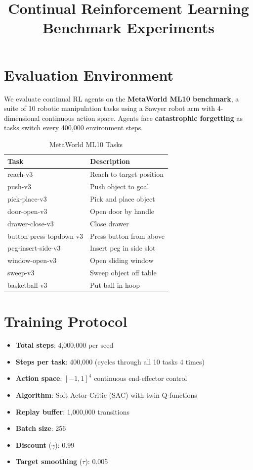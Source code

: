\documentclass{article}
\title{Continual Reinforcement Learning Benchmark Experiments}
\author{}
\date{}
\begin{document}
\maketitle

\section{Evaluation Environment}

We evaluate continual RL agents on the \textbf{MetaWorld ML10 benchmark}, a suite of 10 robotic manipulation tasks using a Sawyer robot arm with 4-dimensional continuous action space. Agents face \textbf{catastrophic forgetting} as tasks switch every 400,000 environment steps.

\begin{table}[h]
\centering
\caption{MetaWorld ML10 Tasks}
\begin{tabular}{ll}
\toprule
Task & Description \\
\midrule
reach-v3 & Reach to target position \\
push-v3 & Push object to goal \\
pick-place-v3 & Pick and place object \\
door-open-v3 & Open door by handle \\
drawer-close-v3 & Close drawer \\
button-press-topdown-v3 & Press button from above \\
peg-insert-side-v3 & Insert peg in side slot \\
window-open-v3 & Open sliding window \\
sweep-v3 & Sweep object off table \\
basketball-v3 & Put ball in hoop \\
\bottomrule
\end{tabular}
\end{table}

\section{Training Protocol}

\begin{itemize}
    \item \textbf{Total steps}: 4,000,000 per seed
    \item \textbf{Steps per task}: 400,000 (cycles through all 10 tasks 4 times)
    \item \textbf{Action space}: $[-1, 1]^4$ continuous end-effector control
    \item \textbf{Algorithm}: Soft Actor-Critic (SAC) with twin Q-functions
    \item \textbf{Replay buffer}: 1,000,000 transitions
    \item \textbf{Batch size}: 256
    \item \textbf{Discount} ($\gamma$): 0.99
    \item \textbf{Target smoothing} ($\tau$): 0.005
\end{itemize}
\end{document}
